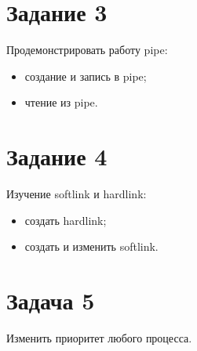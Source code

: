 

\chapter*{Задание 3}

Продемонстрировать работу {\ttfamily pipe}:
\begin{itemize}
	\item создание и запись в {\ttfamily pipe};
	\item чтение из {\ttfamily pipe}.
\end{itemize}



\chapter*{Задание 4}

Изучение {\ttfamily softlink} и {\ttfamily hardlink}:
\begin{itemize}
	\item создать {\ttfamily hardlink};
	\item создать и изменить {\ttfamily softlink}.
\end{itemize}



\chapter*{Задача 5}

Изменить приоритет любого процесса.

